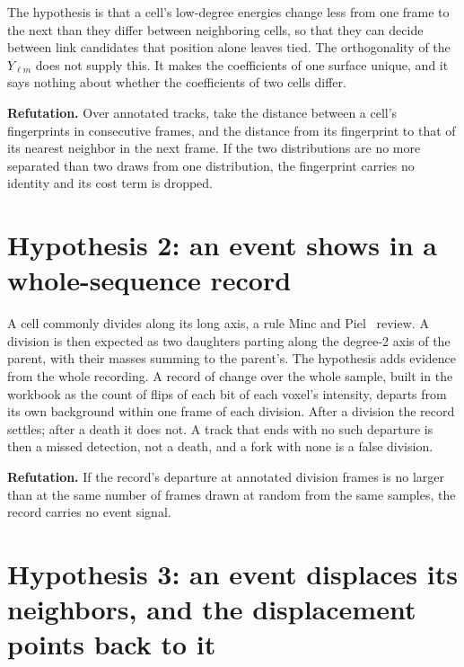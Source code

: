 The hypothesis is that a cell's low-degree energies change less from one frame to the next than they differ between neighboring cells, so that they can decide between link candidates that position alone leaves tied. The orthogonality of the \(Y_{\ell m}\) does not supply this. It makes the coefficients of one surface unique, and it says nothing about whether the coefficients of two cells differ.

\textbf{Refutation.} Over annotated tracks, take the distance between a cell's fingerprints in consecutive frames, and the distance from its fingerprint to that of its nearest neighbor in the next frame. If the two distributions are no more separated than two draws from one distribution, the fingerprint carries no identity and its cost term is dropped.

\section{\texorpdfstring{Hypothesis 2: an event shows in a whole-sequence record}{Hypothesis 2: an event shows in a whole-sequence record}}

A cell commonly divides along its long axis, a rule Minc and Piel~\cite{src:Minc-Piel-2012} review. A division is then expected as two daughters parting along the degree-2 axis of the parent, with their masses summing to the parent's. The hypothesis adds evidence from the whole recording. A record of change over the whole sample, built in the workbook as the count of flips of each bit of each voxel's intensity, departs from its own background within one frame of each division. After a division the record settles; after a death it does not. A track that ends with no such departure is then a missed detection, not a death, and a fork with none is a false division.

\textbf{Refutation.} If the record's departure at annotated division frames is no larger than at the same number of frames drawn at random from the same samples, the record carries no event signal.

\section{\texorpdfstring{Hypothesis 3: an event displaces its neighbors, and the displacement points back to it}{Hypothesis 3: an event displaces its neighbors, and the displacement points back to it}}

